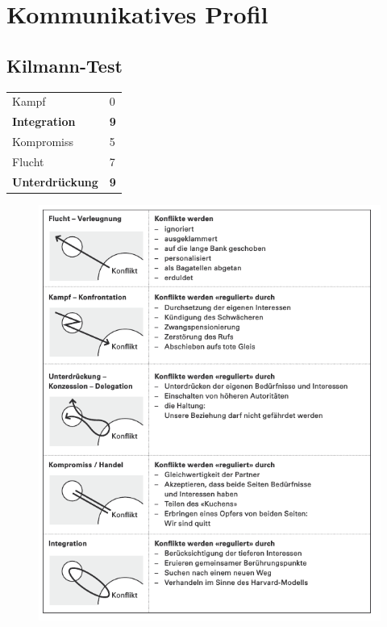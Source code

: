 \chapter{Kommunikatives Profil}
\label{chap:analysis}

\section{Kilmann-Test}
\begin{table}[h]
    \begin{tabular}{ll}
        Kampf                  & 0          \\
        \textbf{Integration}   & \textbf{9} \\
        Kompromiss             & 5          \\
        Flucht                 & 7          \\
        \textbf{Unterdrückung} & \textbf{9}
    \end{tabular}
\end{table}

\begin{figure}[H]
    \includegraphics[scale=0.4]{images/konfliktbearbeitung_schwarz.png}
\end{figure}
